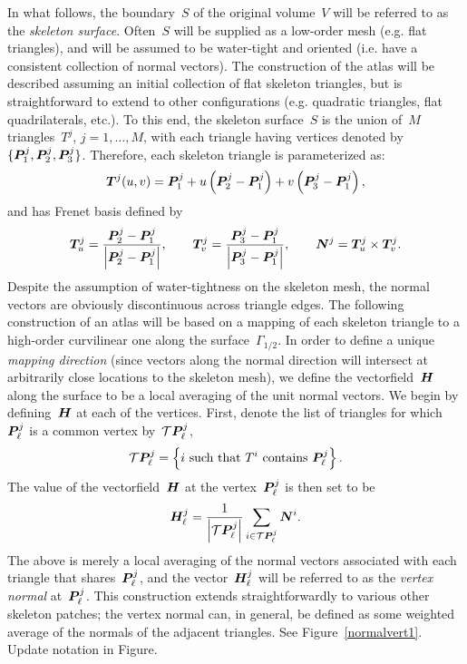\documentclass[11pt]{article}
\numberwithin{equation}{section}
\newcommand{\vct}{\vectorsym}
\newcommand{\lp}{\left(}
\newcommand{\rp}{\right)}
\newcommand{\cT}{\mathcal T}
\begin{document}
In what follows, the boundary~$S$ of the original volume~$V$ will be
referred to as the \emph{skeleton surface}. Often~$S$ will be supplied
as a low-order mesh (e.g. flat triangles), and will be assumed to be
water-tight and oriented (i.e. have a consistent collection of normal
vectors). The construction of the atlas will be described assuming an
initial collection of flat skeleton triangles, but is straightforward
to extend to other configurations (e.g. quadratic triangles, flat
quadrilaterals, etc.). To this end, the skeleton surface~$S$ is the
union of~$M$ triangles~$T^j$, $j=1,\ldots,M$, with each triangle
having vertices denoted
by~$\{ \vct{P}^j_1,\vct{P}^j_2,\vct{P}^j_3 \} $.
Therefore, each skeleton triangle is parameterized as:
\begin{equation}
  \vct{T}^j(u,v) = \vct{P}^j_1 + u \lp \vct{P}^j_2 - \vct{P}^j_1 \rp
  + v \lp \vct{P}^j_3 - \vct{P}^j_1 \rp,
\end{equation}
and has Frenet basis defined by
\begin{equation}
\vct{T}^j_u = \frac{\vct{P}^j_2 - \vct{P}^j_1}{\left| \vct{P}^j_2 -
    \vct{P}^j_1 \right|}, \qquad
\vct{T}^j_v = \frac{\vct{P}^j_3 - \vct{P}^j_1}{\left| \vct{P}^j_3 -
    \vct{P}^j_1 \right|}, \qquad
\vct{N}^j =  \vct{T}^j_u \times \vct{T}^j_v.
\end{equation}
Despite the assumption of water-tightness on the skeleton mesh, the
normal vectors are obviously discontinuous across triangle edges. The
following construction of an atlas will be based on a mapping of each
skeleton triangle to a high-order curvilinear one along the
surface~$\Gamma_{1/2}$. In order to define a unique \emph{mapping
  direction} (since vectors along the normal direction will intersect
at arbitrarily close locations to the skeleton mesh), we define the
vectorfield~$\vct{H}$ along the surface to be a local averaging of the
unit normal vectors. We begin by defining~$\vct{H}$ at each of the
vertices.  First, denote the list of triangles for
which~$\vct{P}^j_\ell$ is a common vertex by~$\cT \vct{P}^j_\ell$,
\begin{equation}
  \cT \vct{P}^j_\ell = \left\{ i \text{ such that } T^i \text{
      contains } \vct{P}^j_\ell \right\}.
\end{equation}
The value of the vectorfield~$\vct{H}$ at the vertex~$\vct{P}^j_\ell$
is then set to be
\begin{equation}
  \vct{H}^j_\ell = \frac{1}{
    \left|  \cT \vct{P}^j_\ell \right| } \sum_{i \in \cT
    \vct{P}^j_\ell} \vct{N}^i.
\end{equation}
The above is merely a local averaging of the normal vectors associated
with each triangle that shares~$\vct{P}^j_\ell$, and the
vector~$\vct{H}^j_\ell$ will be referred to as the \emph{vertex normal}
at~$\vct{P}^j_\ell$. This construction extends straightforwardly to
various other skeleton patches; the vertex normal can, in general, be
defined as some weighted average of the normals of the adjacent triangles.
See Figure~\ref{normalvert1}. {\color{red} Update notation in Figure.}
\end{document}
